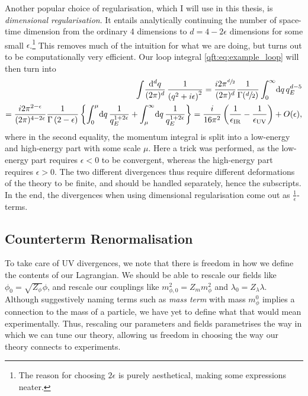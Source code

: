 \documentclass[../main.tex]{subfiles}
\begin{document}
\begin{donotread}
  Another popular choice of regularisation, which I will use in this thesis, is
  \emph{dimensional regularisation}. It entails analytically continuing the
  number of space-time dimension from the ordinary 4 dimensions to \(d
  = 4-2\epsilon\) dimensions for some small \(\epsilon\).\footnote{The reason for choosing \(2\epsilon\) is purely aesthetical, making some expressions neater.} This removes much of
  the intuition for what we are doing, but turns out to be computationally very
  efficient. Our loop integral \cref{qft:eq:example_loop} will then turn into
  \begin{align}
    \nonumber
    \loopintegral[d]{q} \frac{1}{\pclosed{q^2+i\epsilon}^2} = \frac{i
      2\pi^{\sfrac{d}{2}}}{(2\pi)^d} \frac{1}{\Gamma(\sfrac{d}{2})}
    \integral[_0^\infty]{q} q_E^{d-5} \\
    = \frac{i 2\pi^{2-\epsilon}}{(2\pi)^{4-2\epsilon}}
    \frac{1}{\Gamma\pclosed{2-\epsilon}} \cclosed{ \integral[_0^\mu]{q}
    \frac{1}{q_E^{1+2\epsilon}} + \integral[_\mu^\infty]{q}
    \frac{1}{q_E^{1+2\epsilon}} } = \frac{i}{16\pi^2}
    \pclosed{\frac{1}{\epsilon_\text{IR}} - \frac{1}{\epsilon_\text{UV}}} +
    O(\epsilon),
  \end{align}
  where in the second equality, the momentum integral is split into a low-energy
  and high-energy part with some scale \(\mu\). Here a trick was performed, as
  the low-energy part requires \(\epsilon < 0\) to be convergent, whereas the
  high-energy part requires \(\epsilon>0\). The two different divergences thus
  require different deformations of the theory to be finite, and should be
  handled separately, hence the subscripts. In the end, the divergences when using
  dimensional regularisation come out as \(\frac{1}{\epsilon}\)-terms.

  \subsection{Counterterm Renormalisation}
  To take care of UV divergences, we note that there is freedom in how we define
  the contents of our Lagrangian. We should be able to rescale our fields like \(\phi_0 =
  \sqrt{Z_\phi} \phi\), and rescale our couplings like \(m_{\phi,0}^2 = Z_m
  m_\phi^2\) and \(\lambda_0 = Z_\lambda \lambda\). Although suggestively naming
  terms such as \emph{mass term} with mass \(m_\phi^0\) implies a connection to
  the mass of a particle, we have yet to define what that would mean
  experimentally. Thus, rescaling our parameters and fields parametrises the way
  in which we can tune our theory, allowing us freedom in choosing the way our
  theory connects to experiments.


\end{donotread}
\end{document}
